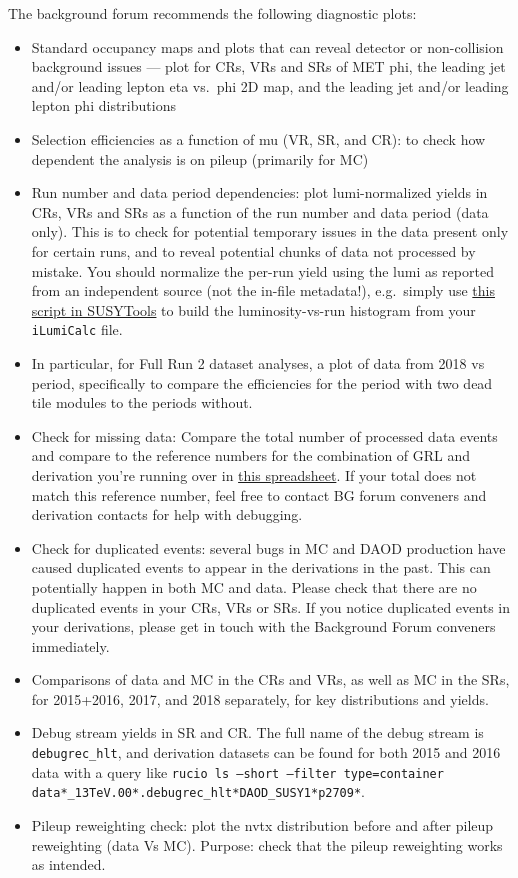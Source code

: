 The background forum recommends the following diagnostic plots:
\begin{itemize}
\item Standard occupancy maps and plots that can reveal detector or non-collision background issues --- plot for CRs, VRs and SRs of MET phi, the leading jet and/or leading lepton eta vs.\ phi 2D map, and the leading jet and/or leading lepton phi distributions
\item Selection efficiencies as a function of mu (VR, SR, and CR): to check how dependent the analysis is on pileup (primarily for MC)
\item Run number and data period dependencies: plot lumi-normalized yields in CRs, VRs and SRs as a function of the run number and data period (data only).
    This is to check for potential temporary issues in the data present only for certain runs, and to reveal potential chunks of data not processed by mistake.
    You should normalize the per-run yield using the lumi as reported from an independent source (not the in-file metadata!),
    e.g.\ simply use \href{https://svnweb.cern.ch/trac/atlasoff/browser/PhysicsAnalysis/SUSYPhys/SUSYTools/trunk/scripts/ilumi2histo.py}{this script in SUSYTools} to build the luminosity-vs-run histogram from your \texttt{iLumiCalc} file.
\item In particular, for Full Run 2 dataset analyses, a plot of data from 2018 vs period, specifically to compare the efficiencies for the period with two dead tile modules to the periods without.
\item Check for missing data: Compare the total number of processed data events and compare to the reference numbers for the combination of GRL and derivation you're running over in \href{https://docs.google.com/spreadsheets/d/1LMioo0nvALkKgoCKRW_ihQThHyVwcOQVRJe4aXiENUs/edit#gid=424865170}{this spreadsheet}. If your total does not match this reference number, feel free to contact BG forum conveners and derivation contacts for help with debugging.
\item Check for duplicated events: several bugs in MC and DAOD production have caused duplicated events to appear in the derivations in the past. This can potentially happen in both MC and data. Please check that there are no duplicated events in your CRs, VRs or SRs. If you notice duplicated events in your derivations, please get in touch with the Background Forum conveners immediately.
\item Comparisons of data and MC in the CRs and VRs, as well as MC in the SRs, for 2015+2016, 2017, and 2018 separately, for key distributions and yields.
\item Debug stream yields in SR and CR\@. The full name of the debug stream is \texttt{debugrec\_hlt}, and derivation datasets can be found for both 2015 and 2016 data with a query like \texttt{rucio ls --short --filter type=container data*\_13TeV.00*.debugrec\_hlt*DAOD\_SUSY1*p2709*}.
\item Pileup reweighting check: plot the nvtx distribution before and after pileup reweighting (data Vs MC). Purpose: check that the pileup reweighting works as intended.
\end{itemize}

